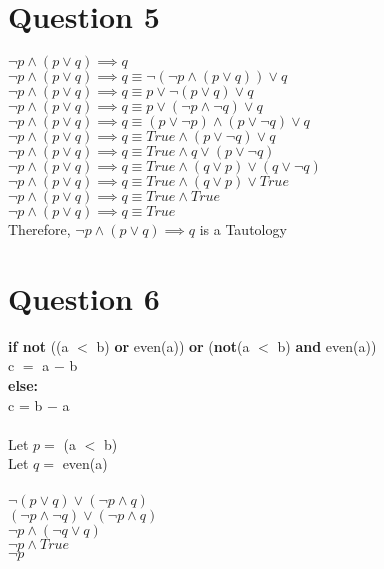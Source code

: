 \documentclass{article}
\begin{document}
    \section*{Question 5}
    $\neg p \land (p \lor q) \implies q$ \\
    $\neg p \land (p \lor q) \implies q \equiv \neg (\neg p \land (p \lor q)) \lor q$ \\
    $\neg p \land (p \lor q) \implies q \equiv p \lor \neg(p \lor q) \lor q$ \\
    $\neg p \land (p \lor q) \implies q \equiv p \lor (\neg p \land \neg q) \lor q$ \\
    $\neg p \land (p \lor q) \implies q \equiv (p \lor \neg p) \land (p \lor \neg q) \lor q$ \\
    $\neg p \land (p \lor q) \implies q \equiv True \land (p \lor \neg q) \lor q$ \\
    $\neg p \land (p \lor q) \implies q \equiv True \land q \lor (p \lor \neg q)$ \\
    $\neg p \land (p \lor q) \implies q \equiv True \land (q \lor p) \lor (q \lor \neg q)$ \\
    $\neg p \land (p \lor q) \implies q \equiv True \land (q \lor p) \lor True$ \\
    $\neg p \land (p \lor q) \implies q \equiv True \land True$ \\
    $\neg p \land (p \lor q) \implies q \equiv True$ \\
    Therefore, $\neg p \land (p \lor q) \implies q$ is a Tautology
    
    \newpage
    \section*{Question 6}
    \textbf{if not} ((a $<$ b) \textbf{or} even(a)) \textbf{or} (\textbf{not}(a $<$ b) \textbf{and} even(a)) \\
    \indent c $=$ a $-$ b \\
    \textbf{else:}\\
    \indent c = b $-$ a \\\\
    Let $p =$ (a $<$ b)\\
    Let $q =$ even(a)\\\\	
    $\neg(p \lor q) \lor (\neg p \land q)$ \\
    $(\neg p \land \neg q) \lor (\neg p \land q)$ \\
    $\neg p \land (\neg q \lor q)$ \\
    $\neg p \land True$ \\
    $\neg p$

   
\end{document}
